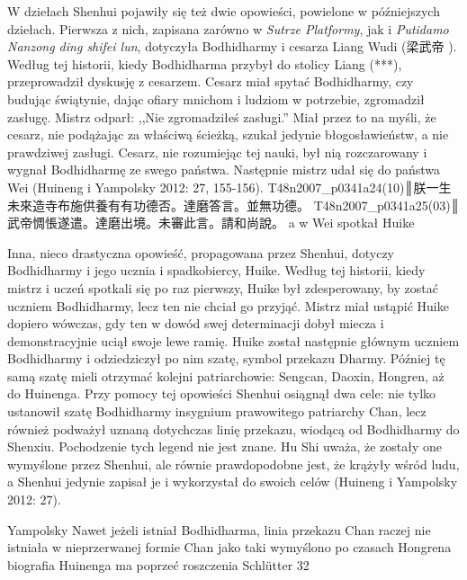 W dziełach Shenhui pojawiły się też dwie opowieści, powielone w późniejszych dziełach. Pierwsza z nich, zapisana zarówno w \textit{Sutrze Platformy}, jak i \textit{Putidamo Nanzong ding shifei lun}, dotyczyła Bodhidharmy i cesarza Liang Wudi (梁武帝 ). Według tej historii, kiedy Bodhidharma przybył do stolicy Liang (***), przeprowadził dyskusję z cesarzem. Cesarz miał spytać Bodhidharmy, czy budując świątynie, dając ofiary mnichom i ludziom w potrzebie, zgromadził zasługę\fnm. Mistrz odparł: ,,Nie zgromadziłeś zasługi.'' Miał przez to na myśli, że cesarz, nie podążając za właściwą ścieżką, szukał jedynie błogosławieństw, a nie prawdziwej zasługi. Cesarz, nie rozumiejąc tej nauki, był nią rozczarowany i wygnał Bodhidharmę ze swego państwa. Następnie mistrz udał się do państwa Wei (Huineng i Yampolsky 2012: 27, 155-156).
T48n2007_p0341a24(10)║朕一生未來造寺布施供養有有功德否。達磨答言。並無功德。
T48n2007_p0341a25(03)║武帝惆悵遂遣。達磨出境。未審此言。請和尚說。
a w Wei spotkał Huike
\fi
{}

Inna, nieco drastyczna opowieść, propagowana przez Shenhui, dotyczy Bodhidharmy i jego ucznia i spadkobiercy, Huike. Według tej historii, kiedy mistrz i uczeń spotkali się po raz pierwszy, Huike był zdesperowany, by zostać uczniem Bodhidharmy, lecz ten nie chciał go przyjąć. Mistrz miał ustąpić Huike dopiero wówczas, gdy ten w dowód swej determinacji dobył miecza i demonstracyjnie uciął swoje lewe ramię. Huike został następnie głównym uczniem Bodhidharmy i odziedziczył po nim szatę, symbol przekazu Dharmy. Później tę samą szatę mieli otrzymać kolejni patriarchowie: Sengcan, Daoxin, Hongren, aż do Huinenga. Przy pomocy tej opowieści Shenhui osiągnął dwa cele: nie tylko ustanowił szatę Bodhidharmy insygnium prawowitego patriarchy Chan, lecz również podważył uznaną dotychczas linię przekazu, wiodącą od Bodhidharmy do Shenxiu. Pochodzenie tych legend nie jest znane. Hu Shi uważa, że zostały one wymyślone przez Shenhui, ale równie prawdopodobne jest, że krążyły wśród ludu, a Shenhui jedynie zapisał je i wykorzystał do swoich celów (Huineng i Yampolsky 2012: 27).

Yampolsky
Nawet jeżeli istniał Bodhidharma, linia przekazu Chan raczej nie istniała w nieprzerwanej formie
Chan jako taki wymyślono po czasach Hongrena
biografia Huinenga ma poprzeć roszczenia
Schlütter 32
\fi


